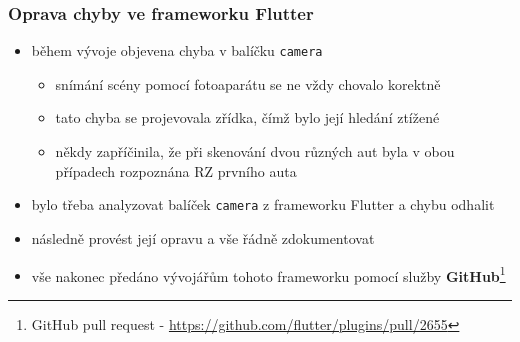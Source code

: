 \documentclass{beamer}
\begin{document}
\begin{frame}
\frametitle{Oprava chyby ve frameworku Flutter}
\begin{itemize}
    \item během vývoje objevena chyba v balíčku \texttt{camera}
    \begin{itemize}
        \item snímání scény pomocí fotoaparátu se ne vždy chovalo korektně
        \item tato chyba se projevovala zřídka, čímž bylo její hledání ztížené
        \item někdy zapříčinila, že při skenování dvou různých aut byla v obou případech rozpoznána RZ prvního auta
    \end{itemize}
    \item bylo třeba analyzovat balíček \texttt{camera} z frameworku Flutter a chybu odhalit
    \item následně provést její opravu a vše řádně zdokumentovat
    \item vše nakonec předáno vývojářům tohoto frameworku pomocí služby \textbf{GitHub}\footnote{GitHub pull request - \url{https://github.com/flutter/plugins/pull/2655}}
\end{itemize}
\end{frame}
\end{document}
